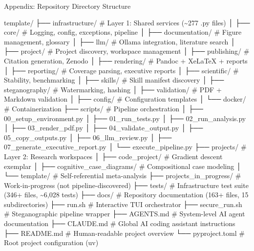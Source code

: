 \documentclass[
  ignorenonframetext,
]{beamer}
\author{\texorpdfstring{}{}}
\date{}
\newenvironment{Shaded}{}{}
\newcommand{\NormalTok}[1]{#1}
\begin{document}
\begin{frame}
\newpage
\end{frame}

\begin{frame}[fragile]{Appendix: Repository Directory Structure}
\protect{}\label{appendix-directory}
\begin{Shaded}
\begin{Highlighting}[]
\NormalTok{template/}
\NormalTok{├── infrastructure/           \# Layer 1: Shared services (\textasciitilde{}277 .py files)}
\NormalTok{│   ├── core/                 \# Logging, config, exceptions, pipeline}
\NormalTok{│   ├── documentation/        \# Figure management, glossary}
\NormalTok{│   ├── llm/                  \# Ollama integration, literature search}
\NormalTok{│   ├── project/              \# Project discovery, workspace management}
\NormalTok{│   ├── publishing/           \# Citation generation, Zenodo}
\NormalTok{│   ├── rendering/            \# Pandoc + XeLaTeX + reports}
\NormalTok{│   ├── reporting/            \# Coverage parsing, executive reports}
\NormalTok{│   ├── scientific/           \# Stability, benchmarking}
\NormalTok{│   ├── skills/               \# Skill manifest discovery}
\NormalTok{│   ├── steganography/        \# Watermarking, hashing}
\NormalTok{│   ├── validation/           \# PDF + Markdown validation}
\NormalTok{│   ├── config/               \# Configuration templates}
\NormalTok{│   └── docker/               \# Containerization}
\NormalTok{├── scripts/                  \# Pipeline orchestration}
\NormalTok{│   ├── 00\_setup\_environment.py}
\NormalTok{│   ├── 01\_run\_tests.py}
\NormalTok{│   ├── 02\_run\_analysis.py}
\NormalTok{│   ├── 03\_render\_pdf.py}
\NormalTok{│   ├── 04\_validate\_output.py}
\NormalTok{│   ├── 05\_copy\_outputs.py}
\NormalTok{│   ├── 06\_llm\_review.py}
\NormalTok{│   ├── 07\_generate\_executive\_report.py}
\NormalTok{│   └── execute\_pipeline.py}
\NormalTok{├── projects/                 \# Layer 2: Research workspaces}
\NormalTok{│   ├── code\_project/         \# Gradient descent exemplar}
\NormalTok{│   ├── cognitive\_case\_diagrams/ \# Compositional case modeling}
\NormalTok{│   └── template/             \# Self{-}referential meta{-}analysis}
\NormalTok{├── projects\_in\_progress/     \# Work{-}in{-}progress (not pipeline{-}discovered)}
\NormalTok{├── tests/                    \# Infrastructure test suite (346+ files, \textasciitilde{}6,028 tests)}
\NormalTok{├── docs/                     \# Repository documentation (163+ files, 15 subdirectories)}
\NormalTok{├── run.sh                    \# Interactive TUI orchestrator}
\NormalTok{├── secure\_run.sh             \# Steganographic pipeline wrapper}
\NormalTok{├── AGENTS.md                 \# System{-}level AI agent documentation}
\NormalTok{├── CLAUDE.md                 \# Global AI coding assistant instructions}
\NormalTok{├── README.md                 \# Human{-}readable project overview}
\NormalTok{└── pyproject.toml            \# Root project configuration (uv)}
\end{Highlighting}
\end{Shaded}
\end{frame}
\end{document}
